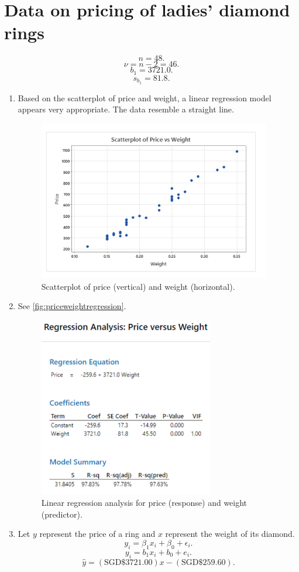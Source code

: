 \documentclass[12pt]{article}
\begin{document}
\section{Data on pricing of ladies' diamond rings}
\[n=48.\]
\[\nu=n-2=46.\]
\[b_1=3721.0.\]
\[s_{b_1}=81.8.\]
\begin{enumerate}
\item Based on the scatterplot of price and weight, a linear regression model appears very appropriate. The data resemble a straight line.
\begin{figure}[h]
\begin{center}
\includegraphics[width=4in]{images/price-weight-scatterplot.png}
\end{center}
\caption{Scatterplot of price (vertical) and weight (horizontal).}
\end{figure}
\item See \autoref{fig:priceweightregression}.
\begin{figure}
\begin{center}
\includegraphics[width=3in]{images/price-weight-regression.png}
\end{center}
\caption{Linear regression analysis for price (response) and weight (predictor).\label{fig:priceweightregression}}
\end{figure}
\item Let $y$ represent the price of a ring and $x$ represent the weight of its diamond. \[y_i=\beta_1x_i+\beta_0+\epsilon_i.\]
\[y_i=b_1x_i+b_0+e_i.\]
\[\hat{y}=(\text{SGD}\$3721.00)x-(\text{SGD}\$259.60).\]


\end{enumerate}
\end{document}
